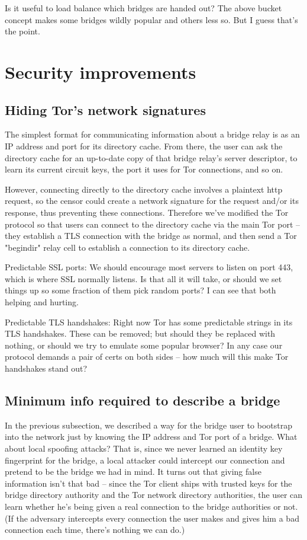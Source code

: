 \documentclass{llncs}
\begin{document}
Is it useful to load balance which bridges are handed out? The above
bucket concept makes some bridges wildly popular and others less so.
But I guess that's the point.

\section{Security improvements}

\subsection{Hiding Tor's network signatures}
\label{subsec:enclave-dirs}

The simplest format for communicating information about a bridge relay
is as an IP address and port for its directory cache. From there, the
user can ask the directory cache for an up-to-date copy of that bridge
relay's server descriptor, to learn its current circuit keys, the port
it uses for Tor connections, and so on.

However, connecting directly to the directory cache involves a plaintext
http request, so the censor could create a network signature for the
request and/or its response, thus preventing these connections. Therefore
we've modified the Tor protocol so that users can connect to the directory
cache via the main Tor port -- they establish a TLS connection with
the bridge as normal, and then send a Tor "begindir" relay cell to
establish a connection to its directory cache.

Predictable SSL ports:
We should encourage most servers to listen on port 443, which is
where SSL normally listens.
Is that all it will take, or should we set things up so some fraction
of them pick random ports? I can see that both helping and hurting.

Predictable TLS handshakes:
Right now Tor has some predictable strings in its TLS handshakes.
These can be removed; but should they be replaced with nothing, or
should we try to emulate some popular browser? In any case our
protocol demands a pair of certs on both sides -- how much will this
make Tor handshakes stand out?

\subsection{Minimum info required to describe a bridge}

In the previous subsection, we described a way for the bridge user
to bootstrap into the network just by knowing the IP address and
Tor port of a bridge. What about local spoofing attacks? That is,
since we never learned an identity key fingerprint for the bridge,
a local attacker could intercept our connection and pretend to be
the bridge we had in mind. It turns out that giving false information
isn't that bad -- since the Tor client ships with trusted keys for the
bridge directory authority and the Tor network directory authorities,
the user can learn whether he's being given a real connection to the
bridge authorities or not. (If the adversary intercepts every connection
the user makes and gives him a bad connection each time, there's nothing
we can do.)
\end{document}
